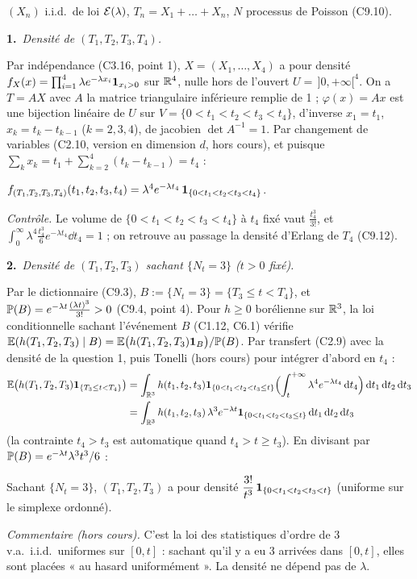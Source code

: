 \documentclass[11pt,a4paper]{article}
\newcommand{\question}[2]{\par\medskip\noindent\textbf{#1}~\textit{#2}\par\smallskip}
\begin{document}
\begin{exo}
$(X_n)$ i.i.d.\ de loi $\mathcal{E}(\lambda)$, $T_n=X_1+\dots+X_n$, $N$ processus de Poisson (C9.10).

\question{1.}{Densité de $(T_1,T_2,T_3,T_4)$.}
Par indépendance (C3.16, point 1), $X=(X_1,\dots,X_4)$ a pour densité $f_X(x)=\prod_{i=1}^4\lambda e^{-\lambda x_i}\mathbf{1}_{x_i>0}$ sur $\mathbb{R}^4$,
nulle hors de l'ouvert $U=\,]0,+\infty[^4$. On a $T=AX$ avec $A$ la matrice triangulaire inférieure remplie de 1 ; $\varphi(x)=Ax$ est une
bijection linéaire de $U$ sur $V=\{0<t_1<t_2<t_3<t_4\}$, d'inverse $x_1=t_1$, $x_k=t_k-t_{k-1}$ ($k=2,3,4$), de jacobien $\det A^{-1}=1$.
Par changement de variables (C2.10, version en dimension $d$, hors cours), et puisque $\sum_kx_k=t_1+\sum_{k=2}^4(t_k-t_{k-1})=t_4$ :
\begin{resultat}$f_{(T_1,T_2,T_3,T_4)}(t_1,t_2,t_3,t_4)=\lambda^4e^{-\lambda t_4}\,\mathbf{1}_{\{0<t_1<t_2<t_3<t_4\}}$.\end{resultat}
\textit{Contrôle.} Le volume de $\{0<t_1<t_2<t_3<t_4\}$ à $t_4$ fixé vaut $\frac{t_4^3}{3!}$, et
$\int_0^\infty\lambda^4\frac{t_4^3}{6}e^{-\lambda t_4}\dd t_4=1$ ; on retrouve au passage la densité d'Erlang de $T_4$ (C9.12).

\question{2.}{Densité de $(T_1,T_2,T_3)$ sachant $\{N_t=3\}$ ($t>0$ fixé).}
Par le dictionnaire (C9.3), $B:=\{N_t=3\}=\{T_3\le t<T_4\}$, et $\mathbb{P}(B)=e^{-\lambda t}\frac{(\lambda t)^3}{3!}>0$ (C9.4, point 4). Pour $h\ge0$
borélienne sur $\mathbb{R}^3$, la loi conditionnelle sachant l'événement $B$ (C1.12, C6.1) vérifie
$\mathbb{E}(h(T_1,T_2,T_3)\mid B)=\mathbb{E}\bigl(h(T_1,T_2,T_3)\mathbf{1}_B\bigr)/\mathbb{P}(B)$. Par transfert (C2.9) avec la densité de la question 1, puis Tonelli
(hors cours) pour intégrer d'abord en $t_4$ :
\begin{align*}
\mathbb{E}\bigl(h(T_1,T_2,T_3)\mathbf{1}_{\{T_3\le t<T_4\}}\bigr)
&=\int_{\mathbb{R}^3}h(t_1,t_2,t_3)\mathbf{1}_{\{0<t_1<t_2<t_3\le t\}}\Bigl(\int_t^{+\infty}\lambda^4e^{-\lambda t_4}\,\mathrm{d} t_4\Bigr)\,\mathrm{d} t_1\,\mathrm{d} t_2\,\mathrm{d} t_3\\
&=\int_{\mathbb{R}^3}h(t_1,t_2,t_3)\,\lambda^3e^{-\lambda t}\mathbf{1}_{\{0<t_1<t_2<t_3\le t\}}\,\mathrm{d} t_1\,\mathrm{d} t_2\,\mathrm{d} t_3
\end{align*}
(la contrainte $t_4>t_3$ est automatique quand $t_4>t\ge t_3$). En divisant par $\mathbb{P}(B)=e^{-\lambda t}\lambda^3t^3/6$ :
\begin{resultat}Sachant $\{N_t=3\}$, $(T_1,T_2,T_3)$ a pour densité $\dfrac{3!}{t^3}\,\mathbf{1}_{\{0<t_1<t_2<t_3<t\}}$ (uniforme sur le simplexe ordonné).\end{resultat}
\textit{Commentaire (hors cours).} C'est la loi des statistiques d'ordre de 3 v.a.\ i.i.d.\ uniformes sur $[0,t]$ : sachant qu'il y a eu
3 arrivées dans $[0,t]$, elles sont placées « au hasard uniformément ». La densité ne dépend pas de $\lambda$.
\end{exo}
\end{document}
